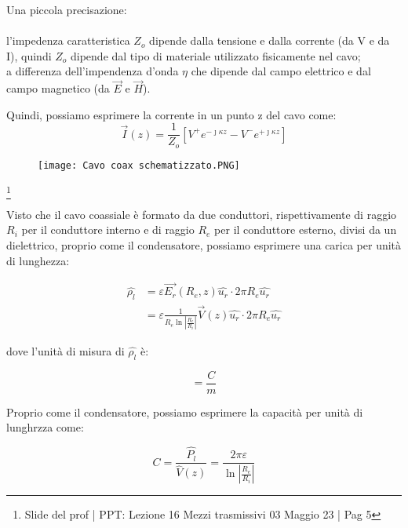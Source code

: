 \begin{tcolorbox}
    Una piccola precisazione: \\ \\  
    l'impedenza caratteristica $Z_o$ dipende dalla tensione e dalla corrente 
    (da V e da I), quindi $Z_o$ dipende dal tipo di materiale utilizzato fisicamente nel cavo; \\ 
    a differenza dell'impendenza d'onda $\eta$ che dipende dal campo elettrico e dal campo magnetico 
    (da $\vec{E}$ e $\vec{H}$).      
\end{tcolorbox}


Quindi, possiamo esprimere la corrente in un punto z del cavo come: 
{\Large \begin{equation}
    \vec{I}(z)= \frac{1}{Z_o} [V^{+} e^{-\jmath \kappa z} - V^{-} e^{+\jmath \kappa z}]
\end{equation}} 

\begin{figure}[h]
    \centering
    \texttt{[image: Cavo coax schematizzato.PNG]}
\end{figure} 

\footnote{Slide del prof | PPT: Lezione 16 Mezzi trasmissivi 03 Maggio 23 | Pag 5} 

Visto che il cavo coassiale è formato da due conduttori, 
rispettivamente di raggio $R_i$ per il conduttore interno e di raggio $R_e$ per il conduttore esterno, 
divisi da un dielettrico, proprio come il condensatore, possiamo esprimere una carica per unità di lunghezza: 

{\Large \begin{equation}
    \begin{split}
        \hat{\rho_l} 
        &= \varepsilon \vec{E_r} (R_e, z) \hat{u_r} \cdot 2 \pi R_e \hat{u_r} \\ 
        &= \varepsilon \frac{1}{R_e \ln \left|\frac{R_e}{R_i}\right|} \vec{V} (z) \hat{u_r}  \cdot 2 \pi R_e \hat{u_r}
    \end{split}
\end{equation}}

dove l'unità di misura di $\hat{\rho_l}$ è: 

{\Large \begin{equation}
    [\hat{\rho_l} ] = \frac{C}{m}   
\end{equation}}

Proprio come il condensatore, possiamo esprimere la capacità per unità di lunghrzza come: 

{\Large \begin{equation}
    C = \frac{\hat{P_l}}{\hat{V} (z)} = \frac{2 \pi \varepsilon}{\ln \left|\frac{R_e}{R_i}\right|}
\end{equation}}

